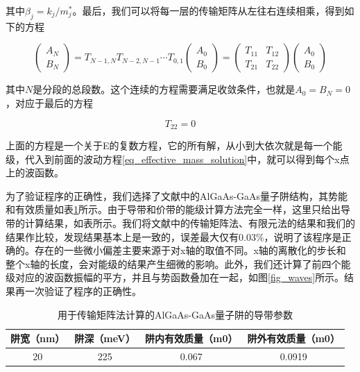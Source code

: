 \documentclass[oneside]{ZJUthesis}
\begin{document}
其中$\beta_j = k_j/m^*_j$。最后，我们可以将每一层的传输矩阵从左往右连续相乘，得到如下的方程

\begin{equation}
    \label{eq_tmm_serial}
    \begin{pmatrix} A_{N} \\ B_{N} \end{pmatrix} = T_{N-1,N}T_{N-2,N-1}\cdots T_{0,1} \begin{pmatrix} A_{0} \\ B_{0} \end{pmatrix} =  \begin{pmatrix} T_{11} & T_{12} \\ T_{21} & T_{22} \end{pmatrix} \begin{pmatrix} A_{0} \\ B_{0} \end{pmatrix}
\end{equation}

其中$N$是分段的总段数。这个连续的方程需要满足收敛条件，也就是$A_0=B_N=0$，对应于最后的方程

\begin{equation}
    \label{eq_t22}
    T_{22}=0
\end{equation}

上面的方程是一个关于E的复数方程，它的所有解，从小到大依次就是每一个能级，代入到前面的波动方程\ref{eq_effective_mass_solution}中，就可以得到每个x点上的波函数。

为了验证程序的正确性，我们选择了文献中的AlGaAs-GaAs量子阱结构\cite{jonsson1990solving}，其势能和有效质量如表\ref{tmm_sample}所示。由于导带和价带的能级计算方法完全一样，这里只给出导带的计算结果，如表所示。我们将文献中的传输矩阵法\cite{jonsson1990solving}、有限元法\cite{nakamura1989finite}的结果和我们的结果作比较，发现结果基本上是一致的，误差最大仅有0.03\%，说明了该程序是正确的。存在的一些微小偏差主要来源于对x轴的取值不同。x轴的离散化的步长和整个x轴的长度，会对能级的结果产生细微的影响。此外，我们还计算了前四个能级对应的波函数振幅的平方，并且与势函数叠加在一起，如图\ref{fig_waves}所示。结果再一次验证了程序的正确性。

\begin{table}[!t]
    \caption{用于传输矩阵法计算的AlGaAs-GaAs量子阱的导带参数}
    \centering
    \label{tmm_sample}
    \begin{tabular}{cccc}
        \hline
        阱宽（nm） & 阱深（meV） & 阱内有效质量（m0） & 阱外有效质量（m0）\\
        \hline
        20                & 225                 & 0.067                          & 0.0919\\
        \hline
    \end{tabular}
\end{table}
\end{document}
